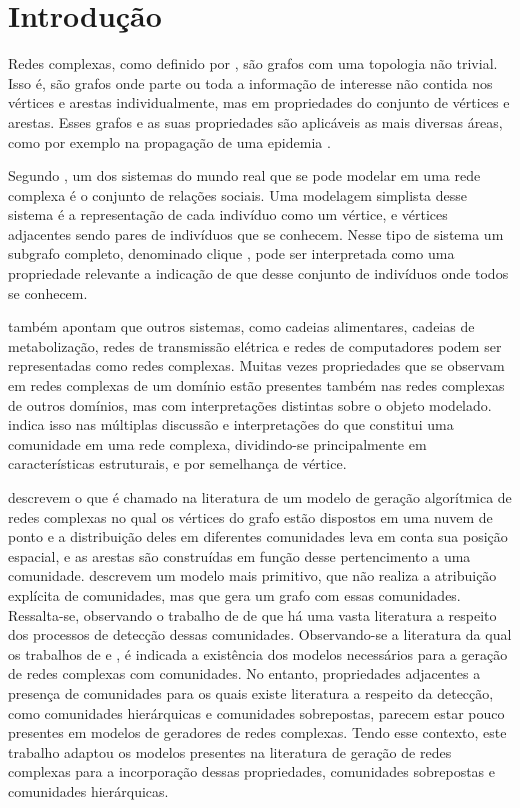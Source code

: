 \documentclass[notes.tex]{subfiles}
\begin{document}
\chapter{Introdução}

Redes complexas, como definido por , são grafos com uma topologia não trivial.
Isso é, são grafos onde parte ou toda a informação de interesse não contida nos vértices e arestas individualmente, mas em propriedades do conjunto de vértices e arestas.
Esses grafos e as suas propriedades são aplicáveis as mais diversas áreas, como por exemplo na propagação de uma epidemia .

Segundo , um dos sistemas do mundo real que se pode modelar em uma rede complexa é o conjunto de relações sociais.
Uma modelagem simplista desse sistema é a representação de cada indivíduo como um vértice, e vértices adjacentes sendo pares de indivíduos que se conhecem.
Nesse tipo de sistema um subgrafo completo, denominado clique \cite{fortunato2010community}, pode ser interpretada como uma propriedade relevante a indicação de que desse conjunto de indivíduos onde todos se conhecem.

 também apontam que outros sistemas, como cadeias alimentares, cadeias de metabolização, redes de transmissão elétrica e redes de computadores podem ser representadas como redes complexas.
Muitas vezes propriedades que se observam em redes complexas de um domínio estão presentes também nas redes complexas de outros domínios, mas com interpretações distintas sobre o objeto modelado.
 indica isso nas múltiplas discussão e interpretações do que constitui uma comunidade em uma rede complexa, dividindo-se principalmente em características estruturais, e por semelhança de vértice.

 descrevem o que é chamado na literatura de um modelo de geração algorítmica de redes complexas no qual os vértices do grafo estão dispostos em uma nuvem de ponto e a distribuição deles em diferentes comunidades leva em conta sua posição espacial, e as arestas são construídas em função desse pertencimento a uma comunidade.
 descrevem um modelo mais primitivo, que não realiza a atribuição explícita de comunidades, mas que gera um grafo com essas comunidades. 
Ressalta-se, observando o trabalho de  de que há uma vasta literatura a respeito dos processos de detecção dessas comunidades.
Observando-se a literatura da qual os trabalhos de  e , é indicada a existência dos modelos necessários para a geração de redes complexas com comunidades.
No entanto, propriedades adjacentes a presença de comunidades para os quais existe literatura a respeito da detecção, como comunidades hierárquicas e comunidades sobrepostas, parecem estar pouco presentes em modelos de geradores de redes complexas.
Tendo esse contexto, este trabalho adaptou os modelos presentes na literatura de geração de redes complexas para a incorporação dessas propriedades, comunidades sobrepostas e comunidades hierárquicas.
\end{document}
